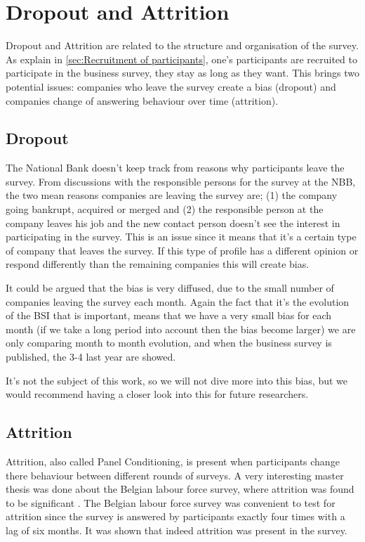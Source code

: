 \documentclass[12pt,a4paper,oneside]{book}
\begin{document}
\section{Dropout and Attrition}

Dropout and Attrition are related to the structure and organisation of the survey. 
As explain in \autoref{sec:Recruitment of participants}, one's participants are recruited to participate in the business survey, they stay as long as they want. This brings two potential issues: companies who leave the survey create a bias (dropout) and companies change of answering behaviour over time (attrition).

\subsection{Dropout}

The National Bank doesn't keep track from reasons why participants leave the survey. From discussions with the responsible persons for the survey at the NBB, the two mean reasons companies are leaving the survey are; (1) the company going bankrupt, acquired or merged and (2) the responsible person at the company leaves his job and the new contact person doesn't see the interest in participating in the survey.
This is an issue since it means that it's a certain type of company that leaves the survey. If this type of profile has a different opinion or respond differently than the remaining companies this will create bias. 


It could be argued that the bias is very diffused, due to the small number of companies leaving the survey each month. Again the fact that it's the evolution of the BSI that is important, means that we have a very small bias for each month (if we take a long period into account then the bias become larger) we are only comparing month to month evolution, and when the business survey is published, the 3-4 last year are showed.

It's not the subject of this work, so we will not dive more into this bias, but we would recommend having a closer look into this for future researchers.

\subsection{Attrition}

Attrition, also called Panel Conditioning, is present when participants change there behaviour between different rounds of surveys. 
A very interesting master thesis was done about the Belgian labour force survey, where attrition was found to be significant \cite{priyana_hardjawidjaksana_investigating_2019}.
The Belgian labour force survey was convenient to test for attrition since the survey is answered by participants exactly four times with a lag of six months.
It was shown that indeed attrition was present in the survey.
\end{document}
